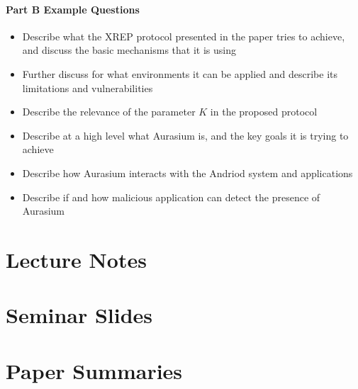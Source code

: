 \documentclass[12pt, a4paper]{report}
\begin{document}
\begin{multicols*}{2}
\subsubsection{Part B Example Questions}
\begin{itemize}
	\item Describe what the XREP protocol presented in the paper tries to achieve, and discuss the basic mechanisms that it is using
	\item Further discuss for what environments it can be applied and describe its limitations and vulnerabilities
	\item Describe the relevance of the parameter $K$ in the proposed protocol
	\item Describe at a high level what Aurasium is, and the key goals it is trying to achieve
	\item Describe how Aurasium interacts with the Andriod system and applications
	\item Describe if and how malicious application can detect the presence of Aurasium
\end{itemize}

\chapter{Lecture Notes}





\chapter{Seminar Slides}














\chapter{Paper Summaries}






























\end{multicols*}
\end{document}

